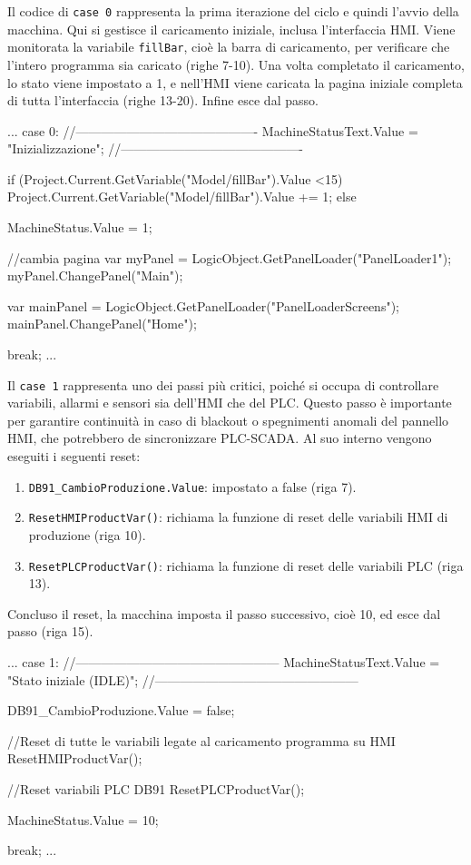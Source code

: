 Il codice di \verb|case 0| rappresenta la prima iterazione del ciclo e quindi l'avvio della macchina. Qui si gestisce il caricamento iniziale, inclusa l'interfaccia HMI. Viene monitorata la variabile \verb|fillBar|, cioè la barra di caricamento, per verificare che l'intero programma sia caricato (righe 7-10). Una volta completato il caricamento, lo stato viene impostato a 1, e nell'HMI viene caricata la pagina iniziale completa di tutta l'interfaccia (righe 13-20). Infine esce dal passo.
\begin{csharp}
...
    case 0:
        //-------------------------------------------
        MachineStatusText.Value = "Inizializzazione";
        //-------------------------------------------
    
        if (Project.Current.GetVariable("Model/fillBar").Value <15)
        {
            Project.Current.GetVariable("Model/fillBar").Value += 1;
        }
        else
        {
            MachineStatus.Value = 1;
            
            //cambia pagina
            var myPanel = LogicObject.GetPanelLoader("PanelLoader1");
            myPanel.ChangePanel("Main");
    
            var mainPanel = LogicObject.GetPanelLoader("PanelLoaderScreens");
            mainPanel.ChangePanel("Home");
        }
    
        break;
...
\end{csharp}
Il \verb|case 1| rappresenta uno dei passi più critici, poiché si occupa di controllare variabili, allarmi e sensori sia dell'HMI che del PLC. Questo passo è importante per garantire continuità in caso di blackout o spegnimenti anomali del pannello HMI, che potrebbero de sincronizzare PLC-SCADA. Al suo interno vengono eseguiti i seguenti reset:
\begin{enumerate}
    \item \verb|DB91_CambioProduzione.Value|: impostato a false (riga 7).
    \item \verb|ResetHMIProductVar()|: richiama la funzione di reset delle variabili HMI di produzione (riga 10).
    \item \verb|ResetPLCProductVar()|: richiama la funzione di reset delle variabili PLC (riga 13).
\end{enumerate}
Concluso il reset, la macchina imposta il passo successivo, cioè 10, ed esce dal passo (riga 15).
\begin{csharp}
...
    case 1:   
        //------------------------------------------------
        MachineStatusText.Value = "Stato iniziale (IDLE)";
        //------------------------------------------------
    
        DB91_CambioProduzione.Value = false;
    
        //Reset di tutte le variabili legate al caricamento programma su HMI
        ResetHMIProductVar();
    
        //Reset variabili PLC DB91
        ResetPLCProductVar();
    
        MachineStatus.Value = 10;
    
        break;
...
\end{csharp}

